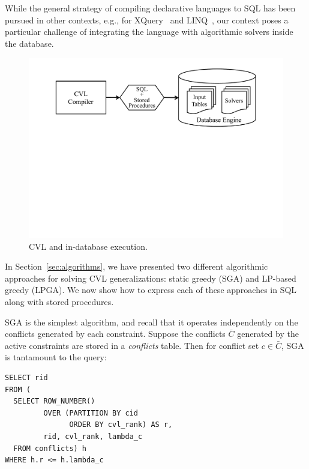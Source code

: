 While the general strategy of compiling declarative languages to SQL has been pursued in other contexts, e.g., for XQuery~\cite{pathfinder} and LINQ~\cite{ferry}, our context poses a particular challenge of integrating the language with algorithmic solvers inside the database. 

\begin{figure}[htbp]
\begin{center}
\includegraphics[scale=.35,viewport=400 375 450 550]{figs/indatabase-execution.pdf}
\caption{CVL and in-database execution.}
\label{fig:indatabase}
\end{center}
\end{figure}

In Section~\ref{sec:algorithms}, we have presented two different algorithmic approaches for solving CVL generalizations: static greedy (SGA) and LP-based greedy (LPGA). We now show how to express each of these approaches in SQL along with stored procedures. 

SGA is the simplest algorithm, and recall that it operates independently on the conflicts generated by each constraint. Suppose the conflicts $\bar{C}$ generated by the active constraints are stored in a \emph{conflicts} table. Then for conflict set $c \in \bar{C}$, SGA is tantamount to the query:

\begin{lstlisting}
SELECT rid
FROM (
  SELECT ROW_NUMBER() 
         OVER (PARTITION BY cid
               ORDER BY cvl_rank) AS r,
         rid, cvl_rank, lambda_c
  FROM conflicts) h
WHERE h.r <= h.lambda_c
\end{lstlisting}


